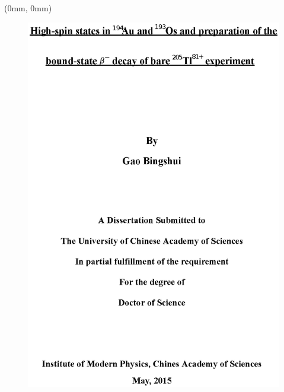 \begin{textblock*}{210mm}(0mm, 0mm)
\begin{figure}[!hbt]
	\centering
	\includegraphics[width=210mm]{fig/cover_en.eps}
\end{figure}
\end{textblock*}

